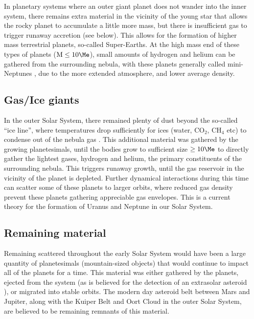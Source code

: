 In planetary systems where an outer giant planet does not wander into the inner system, there remains extra material in the vicinity of the young star that allows the rocky planet to accumulate a little more mass, but there is insufficient gas to trigger runaway accretion (see below). This allows for the formation of higher mass terrestrial planets, so-called Super-Earths. At the high mass end of these types of planets ($\textrm{M}\leq10\Me$), small amounts of hydrogen and helium can be gathered from the surrounding nebula, with these planets generally called mini-Neptunes \citep{2009Barnes,2012Mooij}, due to the more extended atmosphere, and lower average density. 


\subsection{Gas/Ice giants}
In the outer Solar System, there remained plenty of dust beyond the so-called ``ice line'', where temperatures drop sufficiently for ices (water, CO$_{2}$, CH$_{4}$ etc) to condense out of the nebula gas \citep{2012Martina,2013Martinb,2016Schlaufman}. This additional material was gathered by the growing planetesimals, until the bodies grow to sufficient size $\geq10\Me$ to directly gather the lightest gases, hydrogen and helium, the primary constituents of the surrounding nebula. This triggers runaway growth, until the gas reservoir in the vicinity of the planet is depleted. Further dynamical interactions during this time can scatter some of these planets to larger orbits, where reduced gas density prevent these planets gathering appreciable gas envelopes. This is a current theory for the formation of Uranus and Neptune \citep{2002Thommes} in our Solar System.

\subsection{Remaining material}
Remaining scattered throughout the early Solar System would have been a large quantity of planetesimals (mountain-sized objects) that would continue to impact all of the planets for a time. This material was either gathered by the planets, ejected from the system (as is believed for the detection of an extrasolar asteroid \citealt{meech2017a}), or migrated into stable orbits. The modern day asteroid belt between Mars and Jupiter, along with the Kuiper Belt and Oort Cloud in the outer Solar System, are believed to be remaining remnants of this material. 

